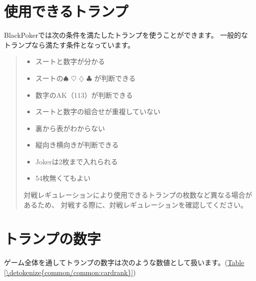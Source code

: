 \documentclass[letterpaper,10pt,dvipdfmx]{sphinxmanual}
\begin{document}
\section{使用できるトランプ}
\label{\detokenize{common/common:id4}}
\sphinxAtStartPar
BlackPokerでは次の条件を満たしたトランプを使うことができます。
一般的なトランプなら満たす条件となっています。
\begin{quote}
\begin{itemize}
\item {} 
\sphinxAtStartPar
スートと数字が分かる

\item {} 
\sphinxAtStartPar
スートの{\normalsize $\spadesuit$} {\normalsize $\heartsuit$} {\normalsize $\diamondsuit$} {\normalsize $\clubsuit$} が判断できる

\item {} 
\sphinxAtStartPar
数字のA\sphinxhyphen{}K（1\sphinxhyphen{}13）が判断できる

\item {} 
\sphinxAtStartPar
スートと数字の組合せが重複していない

\item {} 
\sphinxAtStartPar
裏から表がわからない

\item {} 
\sphinxAtStartPar
縦向き横向きが判断できる

\item {} 
\sphinxAtStartPar
Jokerは2枚まで入れられる

\item {} 
\sphinxAtStartPar
54枚無くてもよい

\end{itemize}

\sphinxAtStartPar
対戦レギュレーションにより使用できるトランプの枚数など異なる場合があるため、
対戦する際に、対戦レギュレーションを確認してください。
\end{quote}


\section{トランプの数字}
\label{\detokenize{common/common:id5}}
\sphinxAtStartPar
ゲーム全体を通してトランプの数字は次のような数値として扱います。(\hyperref[\detokenize{common/common:cardrank}]{Table \ref{\detokenize{common/common:cardrank}}})
\end{document}
